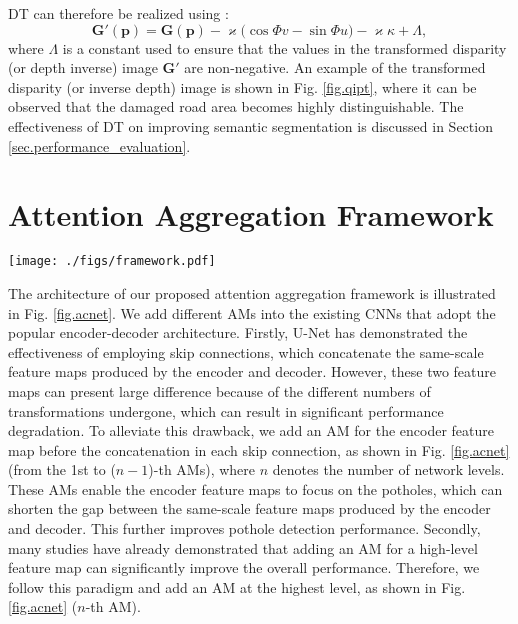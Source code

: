 \documentclass[runningheads]{llncs}
\begin{document}
DT can therefore be realized using \cite{fan2019road}:
\begin{equation}
\mathbf{G}'(\mathbf{p})=\mathbf{G}(\mathbf{p})-\varkappa\big(\cos\Phi v - \sin\Phi u \big) - \varkappa\kappa + \Lambda,
\end{equation}
where $\Lambda$ is a constant used to ensure that the values in the transformed disparity (or depth inverse) image $\mathbf{G}'$ are non-negative.
An example of the transformed disparity (or inverse depth) image is shown in Fig. \ref{fig.qipt}, where it can be observed that the damaged road area becomes highly distinguishable. The effectiveness of DT on improving semantic segmentation is discussed in Section \ref{sec.performance_evaluation}.


\section{Attention Aggregation Framework}
\label{sec.attention_combination_framework}

\begin{figure*}[t]
    \centering
    \texttt{[image: ./figs/framework.pdf]}
    \caption{The architecture of the proposed attention aggregation framework for our AA-UNet and AA-RTFNet.}
    \label{fig.acnet}
\end{figure*}

The architecture of our proposed attention aggregation framework is illustrated in Fig. \ref{fig.acnet}. We add different AMs into the existing CNNs that adopt the popular encoder-decoder architecture. Firstly, U-Net \cite{ronneberger2015u} has demonstrated the effectiveness of employing skip connections, which concatenate the same-scale feature maps produced by the encoder and decoder. However, these two feature maps can present large difference because of the different numbers of transformations undergone, which can result in significant performance degradation. To alleviate this drawback, we add an AM for the encoder feature map before the concatenation in each skip connection, as shown in Fig. \ref{fig.acnet} (from the 1st to ($n-1$)-th AMs), where $n$ denotes the number of network levels. These AMs enable the encoder feature maps to focus on the potholes, which can shorten the gap between the same-scale feature maps produced by the encoder and decoder. This further improves pothole detection performance. Secondly, many studies \cite{fu2019dual,huang2019ccnet} have already demonstrated that adding an AM for a high-level feature map can significantly improve the overall performance. Therefore, we follow this paradigm and add an AM at the highest level, as shown in Fig. \ref{fig.acnet} ($n$-th AM).
\end{document}
